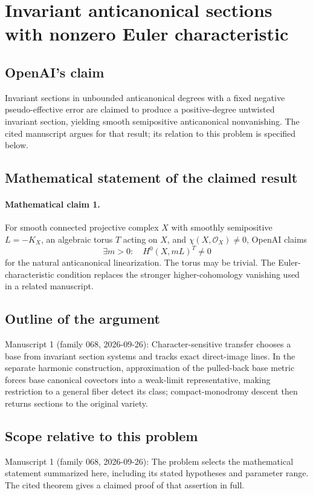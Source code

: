 \documentclass[11pt]{article}
\begin{document}
\section*{Invariant anticanonical sections with nonzero Euler characteristic}

\subsection{OpenAI's claim}
Invariant sections in unbounded anticanonical degrees with a fixed negative pseudo-effective error are claimed to produce a positive-degree untwisted invariant section, yielding smooth semipositive anticanonical nonvanishing. The cited manuscript argues for that result; its relation to this problem is specified below.

\subsection{Mathematical statement of the claimed result}
\paragraph{Mathematical claim 1.} For smooth connected projective complex $X$ with smoothly semipositive $L=-K_X$, an algebraic torus $T$ acting on $X$, and $\chi(X,\mathcal O_X)\ne0$, OpenAI claims
\[
\exists m>0:\quad H^0(X,mL)^T\ne0
\]
for the natural anticanonical linearization. The torus may be trivial. The Euler-characteristic condition replaces the stronger higher-cohomology vanishing used in a related manuscript.

\subsection{Outline of the argument}
Manuscript 1 (family 068, 2026-09-26): Character-sensitive transfer chooses a base from invariant section systems and tracks exact direct-image lines. In the separate harmonic construction, approximation of the pulled-back base metric forces base canonical covectors into a weak-limit representative, making restriction to a general fiber detect its class; compact-monodromy descent then returns sections to the original variety.

\subsection{Scope relative to this problem}
Manuscript 1 (family 068, 2026-09-26): The problem selects the mathematical statement summarized here, including its stated hypotheses and parameter range. The cited theorem gives a claimed proof of that assertion in full.
\end{document}
